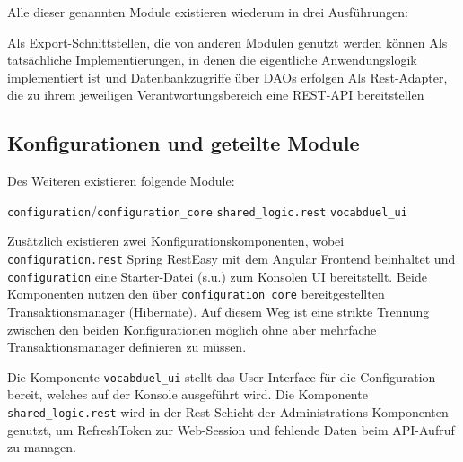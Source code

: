 Alle dieser genannten Module existieren wiederum in drei Ausführungen:
\begin{outline}
    \1 Als Export-Schnittstellen, die von anderen Modulen genutzt werden können
    \1 Als tatsächliche Implementierungen, in denen die eigentliche Anwendungslogik implementiert ist und Datenbankzugriffe über DAOs erfolgen
    \1 Als Rest-Adapter, die zu ihrem jeweiligen Verantwortungsbereich eine REST-API bereitstellen
\end{outline}

\subsection{Konfigurationen und geteilte Module}\label{subsec:konfigurationen-und-geteilte-module}

Des Weiteren existieren folgende Module:

\begin{outline}
    \1 \texttt{configuration}/\texttt{configuration\_core}
    \1 \texttt{shared\_logic.rest}
    \1 \texttt{vocabduel\_ui}
\end{outline}

Zusätzlich existieren zwei Konfigurationskomponenten, wobei \texttt{configuration.rest} Spring RestEasy mit dem Angular Frontend beinhaltet und
\texttt{configuration} eine Starter-Datei (s.u.) zum Konsolen UI bereitstellt.
Beide Komponenten nutzen den über \texttt{configuration\_core} bereitgestellten Transaktionsmanager (Hibernate).
Auf diesem Weg ist eine strikte Trennung zwischen den beiden Konfigurationen möglich ohne aber mehrfache Transaktionsmanager definieren zu müssen.

Die Komponente \texttt{vocabduel\_ui} stellt das User Interface für die Configuration bereit, welches auf der Konsole ausgeführt wird.
Die Komponente \texttt{shared\_logic.rest} wird in der Rest-Schicht der Administrations-Komponenten genutzt, um RefreshToken
zur Web-Session und fehlende Daten beim API-Aufruf zu managen.


